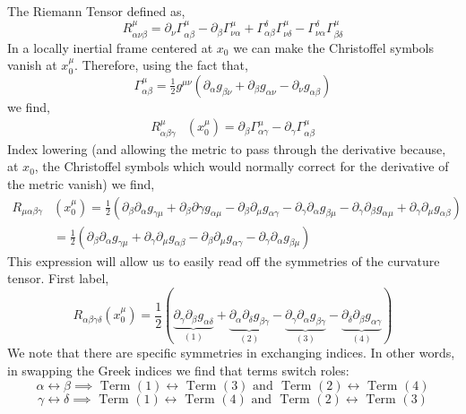 \documentclass[12pt]{article}
\begin{document}
The Riemann Tensor defined as, 
\[R^\mu_{\alpha \nu \beta} = \partial_{\nu} \Gamma^\mu_{\alpha \beta} - \partial_{\beta} \Gamma^\mu_{\nu \alpha} + \Gamma^{\delta}_{\alpha \beta} \Gamma^{\mu}_{\nu \delta} - \Gamma^\delta_{\nu \alpha} \Gamma^\mu_{\beta \delta} \]
In a locally inertial frame centered at $x_0$ we can make the Christoffel symbols vanish at $x_0^\mu$. Therefore, using the fact that,
\[ \Gamma^\mu_{\alpha\beta} = \tfrac{1}{2}g^{\mu\nu}\left(\partial_\alpha g_{\beta\nu}+\partial_\beta g_{\alpha\nu} - \partial_\nu g_{\alpha\beta}\right) \] 
we find, 
\begin{align*}
R^\mu_{\alpha\beta\gamma}&\left(x^\mu_0\right) = \partial_\beta\Gamma^\mu_{\alpha\gamma} - \partial_\gamma\Gamma^\mu_{\alpha\beta}
\end{align*}
Index lowering (and allowing the metric to pass through the derivative because, at $x_0$, the Christoffel symbols which would normally correct for the derivative of the metric vanish) we find,
\begin{align*}
R_{\mu\alpha\beta\gamma} &(x^\mu_0) = \tfrac{1}{2}\left(\partial_\beta \partial_\alpha g_{\gamma\mu} + \partial_\beta \partial \gamma g_{\alpha\mu} - \partial_\beta \partial_\mu g_{\alpha\gamma} - \partial_\gamma\partial_\alpha g_{\beta\mu} - \partial_\gamma\partial_\beta g_{\alpha\mu} + \partial_\gamma\partial_\mu g_{\alpha\beta}\right)
\\
& = \tfrac{1}{2}\left(\partial_\beta\partial_\alpha g_{\gamma\mu} + \partial_\gamma\partial_\mu g_{\alpha\beta} - \partial_\beta\partial_\mu g_{\alpha\gamma} - \partial_\gamma\partial_\alpha g_{\beta\mu}\right)
\end{align*}
This expression will allow us to easily read off the symmetries of the curvature tensor. First label,
\[R_{\alpha\beta\gamma\delta} (x^\mu_0) =\frac{1}{2}\left(\underbrace{\partial_\gamma\partial_\beta g_{\alpha\delta}}_{(1)} + \underbrace{\partial_\alpha\partial_\delta g_{\beta\gamma}}_{(2)}- \underbrace{ \partial_\gamma\partial_\alpha g_{\beta\gamma} }_{(3)}-\underbrace{ \partial_\delta\partial_\beta g_{\alpha\gamma}}_{(4)}\right)\]
We note that there are specific symmetries in exchanging indices. In other words, in swapping the Greek indices we find that terms switch roles:
\[\alpha \leftrightarrow \beta \implies \text{ Term $(1)$} \leftrightarrow \text{ Term $(3)$} \text{ and } \text{ Term $(2)$} \leftrightarrow \text{ Term $(4)$}\]
\[ \gamma\leftrightarrow \delta \implies \text{ Term $(1)$} \leftrightarrow \text{ Term $(4)$} \text{ and } \text{ Term $(2)$} \leftrightarrow \text{ Term $(3)$}\]
\end{document}
